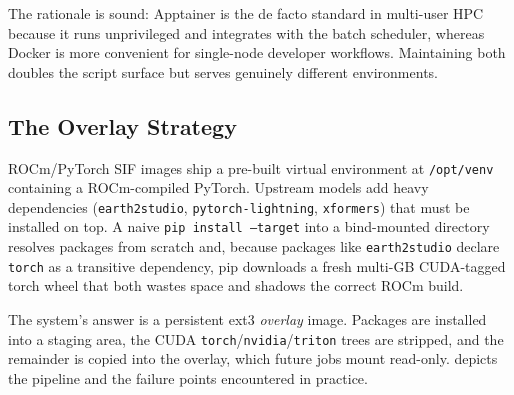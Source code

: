 \documentclass[11pt]{article}
\newcommand{\code}[1]{\texttt{#1}}
\begin{document}
The rationale is sound: Apptainer is the de facto standard in multi-user HPC
because it runs unprivileged and integrates with the batch scheduler, whereas
Docker is more convenient for single-node developer workflows. Maintaining both
doubles the script surface but serves genuinely different environments.

\subsection{The Overlay Strategy}
ROCm/PyTorch SIF images ship a pre-built virtual environment at \code{/opt/venv}
containing a ROCm-compiled PyTorch. Upstream models add heavy dependencies
(\code{earth2studio}, \code{pytorch-lightning}, \code{xformers}) that must be
installed on top. A naive \code{pip install --target} into a bind-mounted directory
resolves packages from scratch and, because packages like \code{earth2studio}
declare \code{torch} as a transitive dependency, pip downloads a fresh multi-GB
CUDA-tagged torch wheel that both wastes space and shadows the correct ROCm build.

The system's answer is a persistent ext3 \emph{overlay} image. Packages are
installed into a staging area, the CUDA \code{torch}/\code{nvidia}/\code{triton}
trees are stripped, and the remainder is copied into the overlay, which future
jobs mount read-only.  depicts the pipeline and the failure
points encountered in practice.
\end{document}
